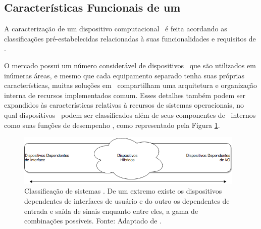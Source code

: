         
        

     
    
    \subsection{Características Funcionais de um \Wearable}
    
        A caracterização de um dispositivo computacional \wearable\ é feita acordando as classificações pré-estabelecidas relacionadas à suas funcionalidades e requisitos de \hardware.
        
        O mercado possui um número considerável de dispositivos \wearables\ que são utilizados em inúmeras áreas, e mesmo que cada equipamento separado tenha suas próprias características, muitas soluções em \hardware\ compartilham uma arquitetura e organização interna de recursos implementados comum.
        Esses detalhes também podem ser expandidos às características relativas à recursos de sistemas operacionais, no qual dispositivos \wearables\ podem ser classificados além de seus componentes de \hardware\ internos como suas funções de desempenho \citep{Delabrida2016, Amorim2017}, como representado pela Figura \ref{fig:classification}.
        
        \begin{figure}[h] \centering
            \includegraphics[width=0.97\textwidth]{img/rt-gradiente.png}
            \caption{Classificação de sistemas \wearables. 
                De um extremo existe os dispositivos dependentes de interfaces de usuário e do outro os dependentes de entrada e saída de sinais enquanto entre eles, a gama de combinações possíveis. Fonte: Adaptado de \citep{Amorim2017}.}
            \label{fig:classification}
        \end{figure}
        
